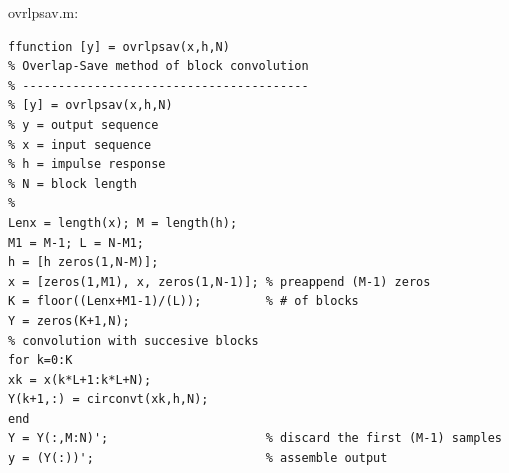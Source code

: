 \documentclass[11pt
  , a4paper
  , article
  , oneside
]{memoir}
\begin{document}
ovrlpsav.m:
\begin{lstlisting}[style=termstyle]
ffunction [y] = ovrlpsav(x,h,N)
% Overlap-Save method of block convolution
% ----------------------------------------
% [y] = ovrlpsav(x,h,N)
% y = output sequence
% x = input sequence
% h = impulse response
% N = block length
%
Lenx = length(x); M = length(h);
M1 = M-1; L = N-M1;
h = [h zeros(1,N-M)];
x = [zeros(1,M1), x, zeros(1,N-1)]; % preappend (M-1) zeros
K = floor((Lenx+M1-1)/(L));         % # of blocks
Y = zeros(K+1,N);
% convolution with succesive blocks
for k=0:K
xk = x(k*L+1:k*L+N);
Y(k+1,:) = circonvt(xk,h,N);
end
Y = Y(:,M:N)';                      % discard the first (M-1) samples
y = (Y(:))';                        % assemble output

\end{lstlisting}
\end{document}
